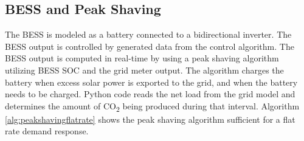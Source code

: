 \documentclass[conference]{IEEEtran}
\begin{document}
    \subsection{BESS and Peak Shaving}
    	The BESS is modeled as a battery connected to a bidirectional inverter. The BESS output is controlled by generated data from the control algorithm. The BESS output is computed in real-time by using a peak shaving algorithm utilizing  BESS SOC and the grid meter output. The algorithm charges the battery when excess solar power is exported to the grid, and when the battery needs to be charged. Python code reads the net load from the grid  model and determines the amount of CO\textsubscript{2} being produced during that interval.  Algorithm \ref{alg:peakshavingflatrate} shows the peak shaving algorithm sufficient for a flat rate demand response. 
\end{document}
